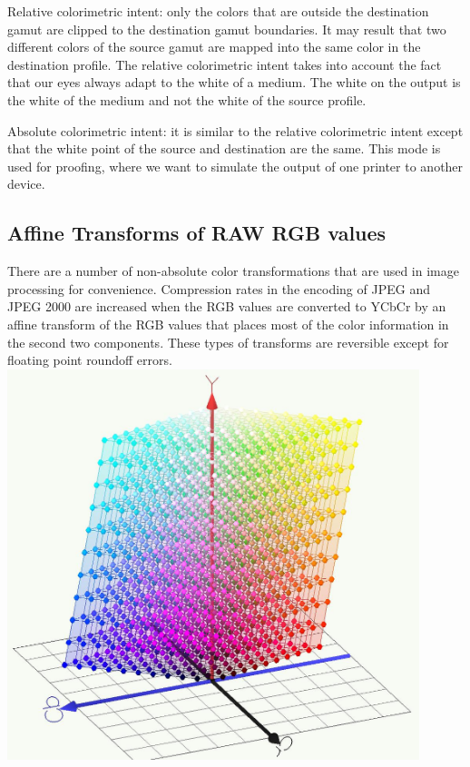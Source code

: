 \documentclass{amsart}
\theoremstyle{definition}
\theoremstyle{remark}
\numberwithin{equation}{section}
\begin{document}
Relative colorimetric intent: only the colors that are outside the destination gamut are
clipped to the destination gamut boundaries. It may result that two different colors of
the source gamut are mapped into the same color in the destination profile. The
relative colorimetric intent takes into account the fact that our eyes always adapt to the white of a medium. The white on the output is the white of the medium and not the
white of the source profile.

Absolute colorimetric intent: it is similar to the relative colorimetric intent except that
the white point of the source and destination are the same. This mode is used for
proofing, where we want to simulate the output of one printer to another device.

\subsection{Affine Transforms of RAW RGB values}
There are a number of non-absolute color transformations that are used in image processing for convenience.  Compression rates in the encoding of JPEG and JPEG 2000 are increased when the RGB values are converted to YCbCr by an affine transform of the RGB values that places most of the color information in the second two components.
These types of transforms are reversible except for floating point roundoff errors.
\includegraphics[width=12.0cm]{images/RGB_TO_YCBCR.jpg}
\end{document}
